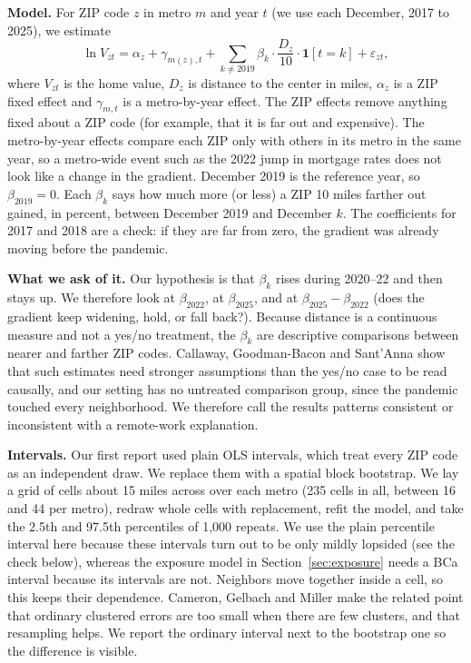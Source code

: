 \documentclass[11pt]{article}
\begin{document}
\textbf{Model.} For ZIP code $z$ in metro $m$ and year $t$ (we use each December, 2017 to 2025), we estimate
\begin{equation}
\ln V_{zt} = \alpha_z + \gamma_{m(z),t} + \sum_{k\neq 2019} \beta_k \cdot \frac{D_z}{10}\cdot \mathbf{1}[t=k] + \varepsilon_{zt},
\label{eq:event}
\end{equation}
where $V_{zt}$ is the home value, $D_z$ is distance to the center in miles, $\alpha_z$ is a ZIP fixed effect and $\gamma_{m,t}$ is a
metro-by-year effect. The ZIP effects remove anything fixed about a ZIP code (for example, that it is far out and expensive).
The metro-by-year effects compare each ZIP only with others in its metro in the same year, so a metro-wide event such as the
2022 jump in mortgage rates does not look like a change in the gradient. December 2019 is the reference year, so $\beta_{2019}=0$.
Each $\beta_k$ says how much more (or less) a ZIP 10 miles farther out gained, in percent, between December 2019 and December $k$.
The coefficients for 2017 and 2018 are a check: if they are far from zero, the gradient was already moving before the pandemic.

\textbf{What we ask of it.} Our hypothesis is that $\beta_k$ rises during 2020--22 and then stays up. We therefore look at
$\beta_{2022}$, at $\beta_{2025}$, and at $\beta_{2025}-\beta_{2022}$ (does the gradient keep widening, hold, or fall back?).
Because distance is a continuous measure and not a yes/no treatment, the $\beta_k$ are descriptive comparisons between nearer
and farther ZIP codes. Callaway, Goodman-Bacon and Sant'Anna \cite{callaway} show that such estimates need stronger assumptions
than the yes/no case to be read causally, and our setting has no untreated comparison group, since the pandemic touched every
neighborhood. We therefore call the results patterns consistent or inconsistent with a remote-work explanation.

\textbf{Intervals.} Our first report used plain OLS intervals, which treat every ZIP code as an independent draw. We
replace them with a spatial block bootstrap. We lay a grid of cells about 15 miles across over each metro (235 cells
in all, between 16 and 44 per metro), redraw whole cells with replacement, refit the model, and take the 2.5th and 97.5th
percentiles of 1,000 repeats. We use the plain percentile interval here because these intervals turn out to be only mildly lopsided
(see the check below), whereas the exposure model in Section~\ref{sec:exposure} needs a BCa interval because its intervals are not.
Neighbors move together inside a cell, so this keeps their dependence. Cameron, Gelbach and Miller
\cite{cameron} make the related point that ordinary clustered errors are too small when there are few clusters, and that
resampling helps. We report the ordinary interval next to the bootstrap one so the difference is visible.
\end{document}

